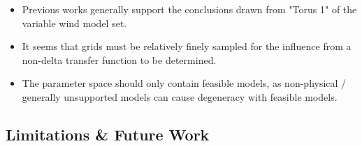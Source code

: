 
\begin{itemize}
    \item Previous works generally support the conclusions drawn from "Torus 1" of the variable wind model set.
    \item It seems that grids must be relatively finely sampled for the influence from a non-delta transfer function to be determined.
    \item The parameter space should only contain feasible models, as non-physical / generally unsupported models can cause degeneracy with feasible models. 
\end{itemize}

\subsection{Limitations \& Future Work}
\label{sec:limitations}

